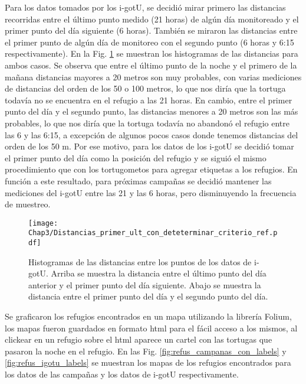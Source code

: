 Para los datos tomados por los i-gotU, se decidió mirar primero las distancias recorridas entre el último punto medido (21 horas) de algún día monitoreado y el primer punto del día siguiente (6 horas). También se miraron las distancias entre el primer punto de algún día de monitoreo con el segundo punto (6 horas y 6:15 respectivamente). En la Fig. \ref{fig:distancias} se muestran los histogramas de las distancias para ambos casos. Se observa que entre el último punto de la noche y el primero de la mañana distancias mayores a 20 metros son muy probables, con varias mediciones de distancias del orden de los 50 o 100 metros, lo que nos diría que la tortuga todavía no se encuentra en el refugio a las 21 horas. En cambio, entre el primer punto del día y el segundo punto, las distancias menores a 20 metros son las más probables, lo que nos diría que la tortuga todavía no abandonó el refugio entre las 6 y las 6:15, a excepción de algunos pocos casos donde tenemos distancias del orden de los 50 m. Por ese motivo, para los datos de los i-gotU se decidió tomar el primer punto del día como la posición del refugio y se siguió el mismo procedimiento que con los tortugometos para agregar etiquetas a los refugios. En función a este resultado, para próximas campañas se decidió mantener las mediciones del i-gotU entre las 21 y las 6 horas, pero disminuyendo la frecuencia de muestreo.
 
 
\begin{figure}[ht]
    \begin{center}
        \texttt{[image: Chap3/Distancias\_primer\_ult\_con\_deteterminar\_criterio\_ref.pdf]}
        \caption[Histogramas de las distancias entre los puntos de los datos de i-gotU.]{ Histogramas de las distancias entre los puntos de los datos de i-gotU. Arriba se muestra la distancia entre el último punto del día anterior y el primer punto del día siguiente. Abajo se muestra la distancia entre el primer punto del día y el segundo punto del día.}
        \label{fig:distancias}
        \end{center}
\end{figure}
 
Se graficaron los refugios encontrados en un mapa utilizando la librería Folium, los mapas fueron guardados en formato html para el fácil acceso a los mismos, al clickear en un refugio sobre el html aparece un cartel con las tortugas que pasaron la noche en el refugio. En las Fig. \ref{fig:refus_campanas_con_labels} y \ref{fig:refus_igotu_labels} se muestran los mapas de los refugios encontrados para los datos de las campañas y los datos de i-gotU respectivamente.
 
